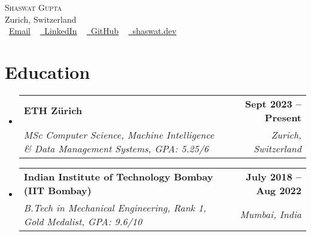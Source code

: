 \documentclass[letterpaper,10pt]{article}
\makeatletter
\newcommand{\resumeSubheading}[4]{
  \vspace{-2pt}\item
    \begin{tabular*}{1.0\textwidth}[t]{l@{\extracolsep{\fill}}r}
      \textbf{#1} & \textbf{\small #2} \\
      \textit{\small#3} & \textit{\small #4} \\
    \end{tabular*}\vspace{-7pt}
}
\newcommand{\resumeSubHeadingListStart}{\begin{itemize}[leftmargin=0.0in, label={}]}
\newcommand{\resumeSubHeadingListEnd}{\end{itemize}}
\makeatother
\begin{document}
\begin{center}
{\Huge \scshape Shaswat Gupta} \\ \vspace{1pt}
Zurich, Switzerland \\ \vspace{1pt}
\small \raisebox{-0.1\height}\faEnvelope\ \href{mailto:shagupta@ethz.ch}{\underline{Email}} ~ 
\href{https://linkedin.com/in/shaswat-gupta/}{\raisebox{-0.2\height}\faLinkedin\ \underline{LinkedIn}}  ~
\href{https://github.com/Shaswat-G}{\raisebox{-0.2\height}\faGithub\ \underline{GitHub}} ~
\href{https://shaswat.dev}{\raisebox{-0.2\height}\faGlobe\ \underline{shaswat.dev}}
\vspace{-8pt}
\end{center}

\section{Education}
  \resumeSubHeadingListStart
    \resumeSubheading
      {ETH Zürich}{Sept 2023 -- Present}
      {MSc Computer Science, Machine Intelligence \& Data Management Systems, GPA: 5.25/6}{Zurich, Switzerland}
    \resumeSubheading
      {Indian Institute of Technology Bombay (IIT Bombay)}{July 2018 -- Aug 2022}
      {B.Tech in Mechanical Engineering, Rank 1, Gold Medalist, GPA: 9.6/10}{Mumbai, India}
  \resumeSubHeadingListEnd

\end{document}
